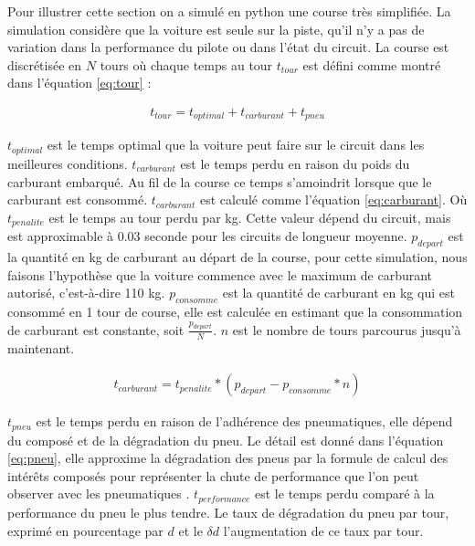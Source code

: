 Pour illustrer cette section on a simulé en python une course très simplifiée. La simulation considère que la voiture est seule sur la piste,
qu'il n'y a pas de variation dans la performance du pilote ou dans l'état du circuit.
La course est discrétisée en $N$ tours où chaque temps au tour $t_{tour}$ est défini comme montré dans l'équation \ref{eq:tour} :

\begin{equation} \label{eq:tour}
    \begin{split}
        t_{tour}=t_{optimal} + t_{carburant} + t_{pneu}
    \end{split}
\end{equation}

$t_{optimal}$ est le temps optimal que la voiture peut faire sur le circuit dans les meilleures conditions.
$t_{carburant}$ est le temps perdu en raison du poids du carburant embarqué. Au fil de la course ce temps s'amoindrit lorsque que
le carburant est consommé. $t_{carburant}$ est calculé comme l'équation \ref{eq:carburant}.
Où $t_{penalite}$ est le temps au tour perdu par kg. Cette valeur dépend du circuit, mais est approximable à 0.03 seconde pour les circuits de longueur moyenne. \cite{royalAcademyOfEngineering} \cite{hurryUpAndWeight}
$p_{depart}$ est la quantité en kg de carburant au départ de la course, pour cette simulation, nous faisons l'hypothèse que la voiture commence avec le maximum de carburant autorisé, c'est-à-dire 110 kg.
$p_{consomme}$ est la quantité de carburant en kg qui est consommé en 1 tour de course, elle est calculée en estimant que la consommation de carburant est constante, soit $\frac{p_{depart}}{N}$.
$n$ est le nombre de tours parcourus jusqu'à maintenant.

\begin{equation} \label{eq:carburant}
    \begin{split}
        t_{carburant} = t_{penalite} * (p_{depart} - p_{consomme} * n)
    \end{split}
\end{equation}

$t_{pneu}$ est le temps perdu en raison de l'adhérence des pneumatiques, elle dépend du composé et de la dégradation du pneu. Le détail est donné dans l'équation \ref{eq:pneu},
elle approxime la dégradation des pneus par la formule de calcul des intérêts composés pour représenter la chute de performance que l'on peut observer avec les pneumatiques \cite{parttimeanalyst}.
$t_{per\textit{f}ormance}$ est le temps perdu comparé à la performance du pneu le plus tendre.
Le taux de dégradation du pneu par tour, exprimé en pourcentage par $d$ et le $\delta{d}$ l'augmentation de ce taux par tour.

